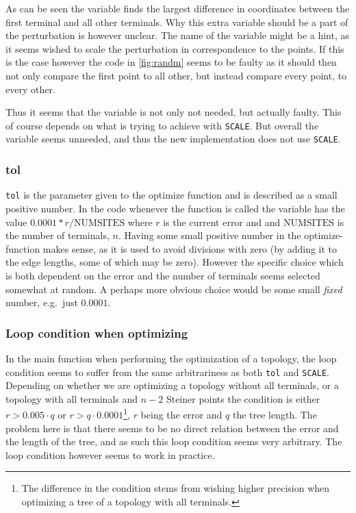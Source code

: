 As can be seen the variable finds the largest difference in coordinates between the first
terminal and all other terminals. Why this extra variable should be a part of
the perturbation is however unclear. The name of the variable might be a hint,
as it seems \citeauthor{smith1992} wished to scale the perturbation in correspondence to the
points. If this is the case however the code in \cref{fig:randm} seems to be
faulty as it should then not only compare the first point to all other, but
instead compare every point, to every other.

Thus it seems that the variable is not only not needed, but actually faulty.
This of course depends on what \citeauthor{smith1992} is trying to achieve with \texttt{SCALE}.
But overall the variable seems unneeded, and thus the new implementation does
not use \texttt{SCALE}.

\subsubsection{tol}
\label{sec:tol}

\texttt{tol} is the parameter given to the optimize function and is described as
a small positive number. In the code whenever the function is called the
variable has the value $0.0001*r/\text{NUMSITES}$ where $r$ is the current
error and and $\text{NUMSITES}$ is the number of terminals, $n$. Having some
small positive number in the optimize-function makes sense, as it is used to
avoid divisions with zero (by adding it to the edge lengths, some of which may
be zero). However the specific choice which is both dependent on the error and
the number of terminals seems selected somewhat at random. A perhaps more
obvious choice would be some small \textit{fixed} number, e.g.\ just
$0.0001$.

\subsubsection{Loop condition when optimizing}
\label{sec:loop-condition-when-1}

In the main function when performing the optimization of a topology, the loop
condition seems to suffer from the same arbitrariness as both \texttt{tol} and
\texttt{SCALE}. Depending on whether we are optimizing a topology without all
terminals, or a topology with all terminals and $n-2$ Steiner points the
condition is either $r > 0.005 \cdot q$ or $r > q \cdot 0.0001$\footnote{The
  difference in the condition stems from wishing higher precision when
  optimizing a tree of a topology with all terminals.}, $r$ being the error and
$q$ the tree length. The problem here is that there seems to be no direct relation
between the error and the length of the tree, and as such this loop condition
seems very arbitrary. The loop condition however seems to work in practice.

